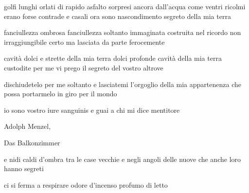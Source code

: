 \clearpage


\begin{poem}
	\begin{stanza}
		golfi lunghi\verseline
		orlati di rapido asfalto\verseline
		sorpresi ancora dall’acqua\verseline
		come ventri ricolmi\verseline
		erano forse contrade e casali\verseline
		ora sono nascondimento segreto\verseline
		della mia terra
	\end{stanza}
\end{poem}

\clearpage


\begin{poem}
	\begin{stanza}
		fanciullezza ombrosa\verseline
		fanciullezza soltanto immaginata\verseline
		costruita nel ricordo\verseline
		non irraggiungibile certo\verseline
		ma lasciata da parte\verseline
		ferocemente
	\end{stanza}

	\begin{stanza}
		cavità dolci e strette della mia terra\verseline
		dolci profonde cavità della mia terra\verseline
		custodite per me vi prego\verseline
		il segreto del vostro altrove
	\end{stanza}

	\begin{stanza}
		dischiudetelo per me soltanto\verseline
		e lasciatemi l’orgoglio\verseline
		della mia appartenenza\verseline
		che possa portarmelo\verseline
		in giro per il mondo
	\end{stanza}

	\begin{stanza}
		io sono vostro iure sanguinis\verseline
		e guai a chi mi dice mentitore
	\end{stanza}
\end{poem}

\clearpage


\begin{artItem}
	Adolph Menzel, \begin{otherlanguage}{german}%
		Das Balkonzimmer%
	\end{otherlanguage}
\end{artItem}

\begin{poem}
	\begin{stanza}
		e nidi caldi d’ombra\verseline
		tra le case vecchie\verseline
		e negli angoli delle nuove\verseline
		che anche loro hanno segreti
	\end{stanza}

	\begin{stanza}
		ci si ferma a respirare\verseline
		odore d’incenso\verseline
		profumo di letto
	\end{stanza}
\end{poem}

